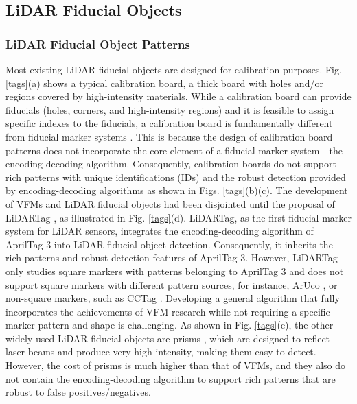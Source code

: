 \subsection{LiDAR Fiducial Objects}
\subsubsection{LiDAR Fiducial Object Patterns}
Most existing LiDAR fiducial objects \cite{cal,cal2,a4} are designed for calibration purposes. Fig. \ref{tags}(a) shows a typical calibration board, a thick board with holes and/or regions covered by high-intensity materials. While a calibration board can provide fiducials (holes, corners, and high-intensity regions) and it is feasible to assign specific indexes to the fiducials, a calibration board is fundamentally different from fiducial marker systems \cite{ap3,aruco}. This is because the design of calibration board patterns does not incorporate the core element of a fiducial marker system—the encoding-decoding algorithm. Consequently, calibration boards \cite{cal,cal2} do not support rich patterns with unique identifications (IDs) and the robust detection provided by encoding-decoding algorithms \cite{wang,olson,ap3,aruco,cctag,arc,arc2} as shown in Figs. \ref{tags}(b)(c).
%
The development of VFMs and LiDAR fiducial objects had been disjointed until the proposal of LiDARTag \cite{lt}, as illustrated in Fig. \ref{tags}(d).
LiDARTag, as the first fiducial marker system for LiDAR sensors, integrates the encoding-decoding algorithm of AprilTag 3 \cite{ap3} into LiDAR fiducial object detection. Consequently, it inherits the rich patterns and robust detection features of AprilTag 3. However, LiDARTag only studies square markers with patterns belonging to AprilTag 3 and does not support square markers with different pattern sources, for instance, ArUco \cite{aruco}, or non-square markers, such as CCTag \cite{cctag}. Developing a general algorithm that fully incorporates the achievements of VFM research while not requiring a specific marker pattern and shape is challenging. As shown in Fig. \ref{tags}(e), the other widely used LiDAR fiducial objects are prisms \cite{station}, which are designed to reflect laser beams and produce very high intensity, making them easy to detect. However, the cost of prisms is much higher than that of VFMs, and they also do not contain the encoding-decoding algorithm to support rich patterns that are robust to false positives/negatives.
%

